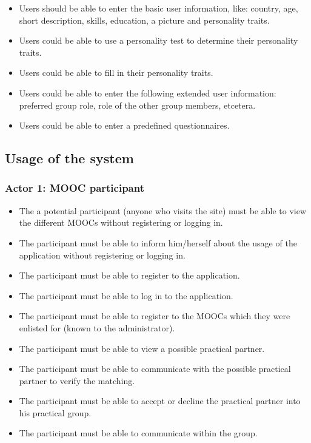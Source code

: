 \begin{itemize}
\item Users should be able to enter the basic user information, like: country, age, short description, skills, education, a picture and personality traits.
\end{itemize}

\begin{itemize}
\item Users could be able to use a personality test to determine their personality traits.
\item Users could be able to fill in their personality traits.
\item Users could be able to enter the following extended user information: preferred group role, role of the other group members, etcetera.
\item Users could be able to enter a predefined questionnaires.
\end{itemize}


\subsection*{Usage of the system}

\subsubsection*{Actor 1: MOOC participant}

\begin{itemize}
\item The a potential participant (anyone who visits the site) must be able to view the different MOOCs without registering or logging in.
\item The participant must be able to inform him/herself about the usage of the application without registering or logging in.
\item The participant must be able to register to the application.
\item The participant must be able to log in to the application.
\item The participant must be able to register to the MOOCs which they were enlisted for (known to the administrator).
\item The participant must be able to view a possible practical partner.
\item The participant must be able to communicate with the possible practical partner to verify the matching.
\item The participant must be able to accept or decline the practical partner into his practical group.
\item The participant must be able to communicate within the group.
\end{itemize}


